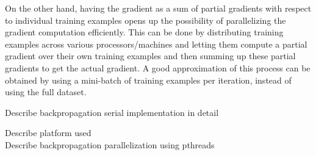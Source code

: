 On the other hand, having the gradient as a sum of partial gradients with respect to individual training examples opens up the possibility of parallelizing the gradient computation efficiently.
This can be done by distributing training examples across various processors/machines and letting them compute a partial gradient over their own training examples and then summing up these partial gradients to get the actual gradient.
A good approximation of this process can be obtained by using a mini-batch of training examples per iteration, instead of using the full dataset.

Describe backpropagation serial implementation in detail

Describe platform used \\
Describe backpropagation parallelization using pthreads
